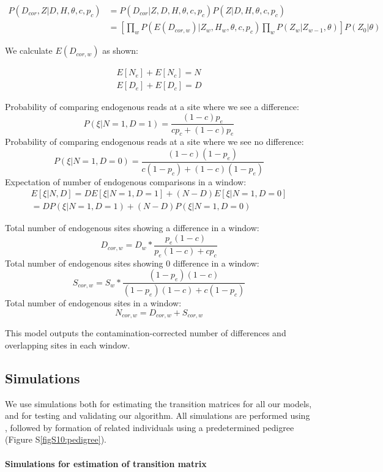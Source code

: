\documentclass[12pt, letterpaper]{article}
\begin{document}
\begin{align}
    P(D_{cor},Z|D,H,\theta,c,p_c) &= P(D_{cor}|Z,D,H,\theta,c,p_c) P(Z|D,H,\theta,c,p_c)\nonumber\\
    &= [\prod_{w} P(E(D_{cor,w})|Z_w, H_w, \theta,c,p_c) \prod_{w} P(Z_w|Z_{w-1}, \theta)] P(Z_0| \theta)
\end{align}

We calculate $E(D_{cor,w})$ as shown:

\begin{align}
    E[N_e] + E[N_c] = N\\
    E[D_e] + E[D_c] = D
\end{align}

Probability of comparing endogenous reads at a site where we see a difference:
$$P(\xi | N = 1,D = 1)=\frac{(1-c) p_e}{c p_c + (1-c) p_e} $$
Probability of comparing endogenous reads at a site where we see no difference:
$$P(\xi | N = 1,D = 0)=\frac{(1-c)(1-p_e)}{c (1-p_c) + (1-c) (1-p_e)} $$
Expectation of number of endogenous comparisons in a window:
\begin{align}
    E[\xi | N, D] = D E[\xi | N=1, D=1] + (N-D) E[\xi | N=1, D=0]\\
    = D P(\xi | N=1, D=1) + (N-D) P(\xi | N=1, D=0)
\end{align}



Total number of endogenous sites showing a difference in a window: 
$$D_{cor,w} = D_w* \frac{p_e(1-c)}{p_e(1-c) + c p_c} $$
Total number of endogenous sites showing 0 difference in a window: 
$$S_{cor,w} = S_w* \frac{(1-p_e)(1-c)}{(1-p_e)(1-c) + c (1-p_c)} $$
Total number of endogenous sites in a window:
$$N_{cor,w} = D_{cor,w} + S_{cor,w}$$

This model outputs the contamination-corrected number of differences and overlapping sites in each window.

\subsection{Simulations}

We use simulations both for estimating the transition matrices for all our models, and for testing and validating our algorithm. All simulations are performed using  \cite{kelleher_efficient_2016}, followed by formation of related individuals using a predetermined pedigree (Figure S\ref{figS10:pedigree}).

\paragraph{Simulations for estimation of transition matrix}
\end{document}
